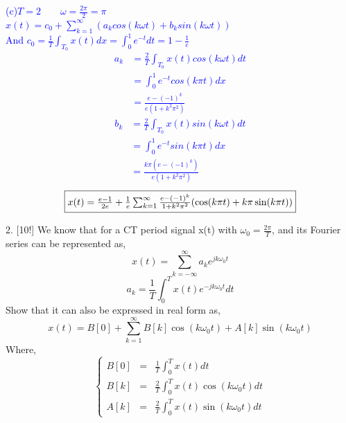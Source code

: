 \documentclass[12pt,a4paper]{article}
\begin{document}
\begin{tcolorbox}
\normalsize
\textcolor{blue}{
(c)$T=2\qquad \omega=\frac{2\pi}{2}=\pi$\\
$x(t)=c_0+\sum_{k=1}^\infty (a_k cos(k\omega t)+b_k sin(k\omega t))$\\
And $c_0=\frac{1}{T} \int_{T_0} x(t) dx=\int_0^1 e^{-t} dt=1-\frac{1}{e}$
$$
\begin{aligned}
    a_{k} &=\frac{2}{T} \int_{T_{0}} x(t) cos (k \omega t) d t\\
    &= \int_0^1 e^{-t} cos (k\pi t) d x\\
    &= \frac{e-(-1)^{k}}{e\left(1+k^{2} \pi^{2}\right)}
\end{aligned}
$$
$$
\begin{aligned}
    b_{k} &=\frac{2}{T} \int_{T_{0}} x(t) sin (k \omega t) d t\\
    &= \int_0^1 e^{-t} sin (k\pi t) d x\\
    &= \frac{k \pi\left(e-(-1)^{k}\right)}{e\left(1+k^{2} \pi^{2}\right)}
\end{aligned}
$$
$$\fbox{$
x(t)=\frac{e-1}{2e}+\frac{1}{e} \sum_{k=1}^{\infty} \frac{e-(-1)^{k}}{1+k^{2} \pi^{2}}(\cos (k \pi t)+k \pi \sin (k \pi t))$}
$$
}
\end{tcolorbox}

\begin{tcolorbox}[colback = white]
2. [10!] We know that for a CT period signal x(t) with $\omega_0=\frac{2\pi}{T}$, and its Fourier series can be represented as,
$$x(t)=\sum_{k=-\infty}^{\infty}a_k e^{j k\omega_0t}$$
$$a_k=\frac{1}{T}\int_0^Tx(t)e^{-jk\omega_0t}dt$$
Show that it can also be expressed in real form as,
$$x(t)=B[0] +\sum_{k=1}^\infty B[k]\cos{(k\omega_0t)}+A[k]\sin{(k\omega_0t)}$$
Where,
$$ \left\{
\begin{aligned}
B[0] & = & \frac{1}{T}\int_0^T x(t)dt \\
B[k] & = & \frac{2}{T}\int_0^T x(t)\cos{(k\omega_0t)}dt \\
A[k] & = & \frac{2}{T}\int_0^T x(t)\sin{(k\omega_0t)}dt
\end{aligned}
\right.
$$
\end{tcolorbox}
\end{document}
